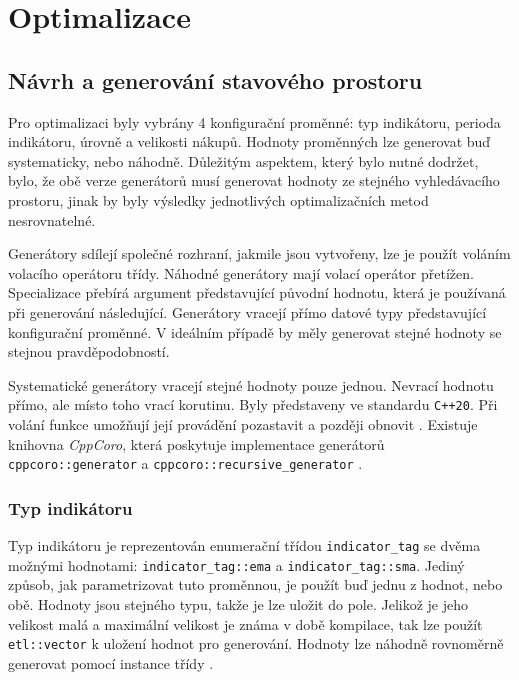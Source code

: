 \chapter{Optimalizace}

\section{Návrh a generování stavového prostoru}
Pro optimalizaci byly vybrány 4 konfigurační proměnné: typ indikátoru, perioda indikátoru, úrovně a velikosti nákupů.
Hodnoty proměnných lze generovat buď systematicky, nebo náhodně.
Důležitým aspektem, který bylo nutné dodržet, bylo, že obě verze generátorů musí generovat hodnoty ze stejného vyhledávacího prostoru, jinak by byly výsledky jednotlivých optimalizačních metod nesrovnatelné.

Generátory sdílejí společné rozhraní, jakmile jsou vytvořeny, lze je použít voláním volacího operátoru třídy.
Náhodné generátory mají volací operátor přetížen.
Specializace přebírá argument představující původní hodnotu, která je používaná při generování následující.
Generátory vracejí přímo datové typy představující konfigurační proměnné.
V ideálním případě by měly generovat stejné hodnoty se stejnou pravděpodobností.

Systematické generátory vracejí stejné hodnoty pouze jednou.
Nevrací hodnotu přímo, ale místo toho vrací korutinu.
Byly představeny ve standardu \texttt{C++20}.
Při volání funkce umožňují její provádění pozastavit a později obnovit \cite{coroutines}.
Existuje knihovna \textit{CppCoro}, která poskytuje implementace generátorů \texttt{cppcoro::generator} a \texttt{cppcoro::recursive\_generator} \cite{cppcoro}.

\subsection{Typ indikátoru}
Typ indikátoru je reprezentován enumerační třídou \texttt{indicator\_tag} se dvěma možnými hodnotami: \texttt{indicator\_tag::ema} a \texttt{indicator\_tag::sma}.
Jediný způsob, jak parametrizovat tuto proměnnou, je použít buď jednu z hodnot, nebo obě.
Hodnoty jsou stejného typu, takže je lze uložit do pole.
Jelikož je jeho velikost malá a maximální velikost je známa v době kompilace, tak lze použít \texttt{etl::vector} k uložení hodnot pro generování.
Hodnoty lze náhodně rovnoměrně generovat pomocí instance třídy .

